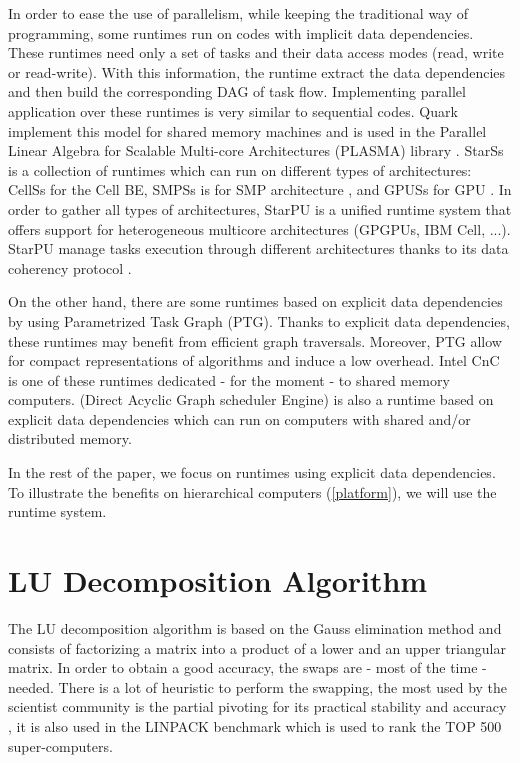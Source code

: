 In order to ease the use of parallelism, while keeping the traditional way of programming, some runtimes run on codes with implicit data dependencies. These runtimes need only a set of tasks and their data access modes (read, write or read-write). With this information, the runtime extract the data dependencies and then build the corresponding DAG of task flow. Implementing parallel application over these runtimes is very similar to sequential codes. Quark implement this model for shared memory machines and is used in the Parallel Linear Algebra for Scalable Multi-core Architectures (PLASMA) library \cite{1742-6596-180-1-012037}.
StarSs is a collection of runtimes which can run on different types of architectures: CellSs for the Cell BE\cite{Bellens06}, SMPSs is for SMP architecture \cite{journals/concurrency/BadiaHLPQQ09}, and GPUSs for GPU \cite{Ayguade09}. In order to gather all types of architectures, StarPU is a unified runtime system that offers support for heterogeneous multicore architectures (GPGPUs, IBM Cell, ...). StarPU manage tasks execution through different architectures thanks to its data coherency protocol \cite{DoBiBo07,journals/concurrency/AugonnetTNW11}.


On the other hand, there are some runtimes based on explicit data dependencies by using Parametrized Task Graph (PTG).
Thanks to explicit data dependencies, these runtimes may benefit from efficient graph traversals. Moreover, PTG allow for compact representations of algorithms and induce a low overhead. Intel CnC is one of these runtimes dedicated - for the moment - to shared memory computers. \dague (Direct Acyclic Graph scheduler Engine) is also a runtime based on explicit data dependencies which can run on computers with shared and/or distributed memory.

In the rest of the paper, we focus on runtimes using explicit data dependencies. To illustrate the benefits on hierarchical computers (\ref{platform}), we will use the \dague runtime system. 

\section{LU Decomposition Algorithm}\label{lu_algo}
The LU decomposition algorithm is based on the Gauss elimination method and consists of factorizing a matrix into a product of a lower and an upper triangular matrix. In order to obtain a good accuracy, the swaps are - most of the time - needed. There is a lot of heuristic to perform the swapping, the most used by the scientist community is the partial pivoting for its practical stability and accuracy \cite{Hig02}, it is also used in the LINPACK benchmark which is used to rank the TOP 500 super-computers.

